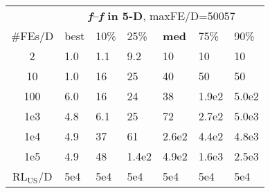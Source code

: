 \begin{tabular}{c|llllll}
 & \multicolumn{6}{|c}{\textbf{\textit{f}\raisebox{-0.35ex}{1}--\textit{f}\raisebox{-0.35ex}{24} in 5-D}, maxFE/D=50057}\\
\#FEs/D & best & 10\% & 25\% & \textbf{med} & 75\% & 90\%\\
2 & \hspace*{1ex}1.0 & \hspace*{1ex}1.1 & \hspace*{1ex}9.2 & 10 & 10 & 10\\
10 & \hspace*{1ex}1.0 & 16 & 25 & 40 & 50 & 50\\
100 & \hspace*{1ex}6.0 & 16 & 24 & 38 & 1.9e2 & 5.0e2\\
1e3 & \hspace*{1ex}4.8 & \hspace*{1ex}6.1 & 25 & 72 & 2.7e2 & 5.0e3\\
1e4 & \hspace*{1ex}4.9 & 37 & 61 & 2.6e2 & 4.4e2 & 4.8e3\\
1e5 & \hspace*{1ex}4.9 & 48 & 1.4e2 & 4.9e2 & 1.6e3 & 2.5e3\\
$\text{RL}_{\text{US}}$/D & 5e4 & 5e4 & 5e4 & 5e4 & 5e4 & 5e4
\end{tabular}
